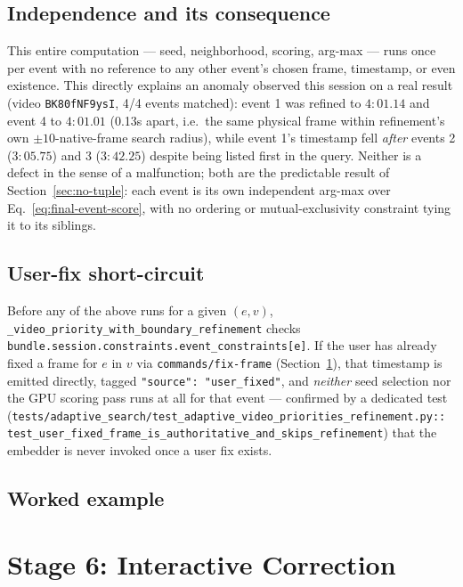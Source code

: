 \documentclass[11pt]{article}
\newcommand{\code}[1]{\texttt{\small #1}}
\newcommand{\file}[1]{\texttt{\footnotesize #1}}
\begin{document}
\subsection{Independence and its consequence}
This entire computation --- seed, neighborhood, scoring, arg-max --- runs
once per event with no reference to any other event's chosen frame,
timestamp, or even existence. This directly explains an anomaly observed
this session on a real result (video \texttt{BK80fNF9ysI}, 4/4 events
matched): event 1 was refined to $4{:}01.14$ and event 4 to $4{:}01.01$
(0.13s apart, i.e.\ the same physical frame within refinement's own
$\pm 10$-native-frame search radius), while event 1's timestamp fell
\emph{after} events 2 ($3{:}05.75$) and 3 ($3{:}42.25$) despite being listed
first in the query. Neither is a defect in the sense of a malfunction; both
are the predictable result of Section~\ref{sec:no-tuple}: each event is its
own independent arg-max over Eq.~\ref{eq:final-event-score}, with no
ordering or mutual-exclusivity constraint tying it to its siblings.

\subsection{User-fix short-circuit}
Before any of the above runs for a given $(e,v)$,
\code{\_video\_priority\_with\_boundary\_refinement} checks
\code{bundle.session.constraints.event\_constraints[e]}. If the user has
already fixed a frame for $e$ in $v$ via \code{commands/fix-frame}
(Section~\ref{sec:stage6}), that timestamp is emitted directly, tagged
\code{"source": "user\_fixed"}, and \emph{neither} seed selection nor the GPU
scoring pass runs at all for that event --- confirmed by a dedicated test
(\file{tests/adaptive\_search/test\_adaptive\_video\_priorities\_refinement.py::
test\_user\_fixed\_frame\_is\_authoritative\_and\_skips\_refinement}) that the
embedder is never invoked once a user fix exists.

\subsection{Worked example}


\section{Stage 6: Interactive Correction}
\label{sec:stage6}
\end{document}
